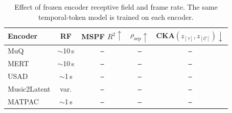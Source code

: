 \documentclass{article}
\newcommand{\zC}{z_{[\mathcal{C}]}}    %
\newcommand{\ztau}{z_{[\tau]}}          %
\newcommand{\res}{\texttt{--}}
\begin{document}
\begin{table}[t]
  \centering
  \setlength{\tabcolsep}{3.5pt}
  \caption{Effect of frozen encoder receptive field and frame rate.
  The same temporal-token model is trained on each encoder.}
  \label{tab:encoder_rf}
  \begin{tabular}{lcccc}
    \toprule
    \textbf{Encoder}
    & \textbf{RF}
    & MSPF $R^2\uparrow$
    & $\rho_{\mathrm{sep}}\uparrow$
    & CKA$(\ztau,\zC)\downarrow$ \\
    \midrule
    MuQ & $\sim$10\,s & \res & \res & \res \\
    MERT & $\sim$10\,s & \res & \res & \res \\
    USAD & $\sim$1\,s & \res & \res & \res \\
    Music2Latent & var. & \res & \res & \res \\
    MATPAC & $\sim$1\,s & \res & \res & \res \\
    \bottomrule
  \end{tabular}
\end{table}




\clearpage




\end{document}
